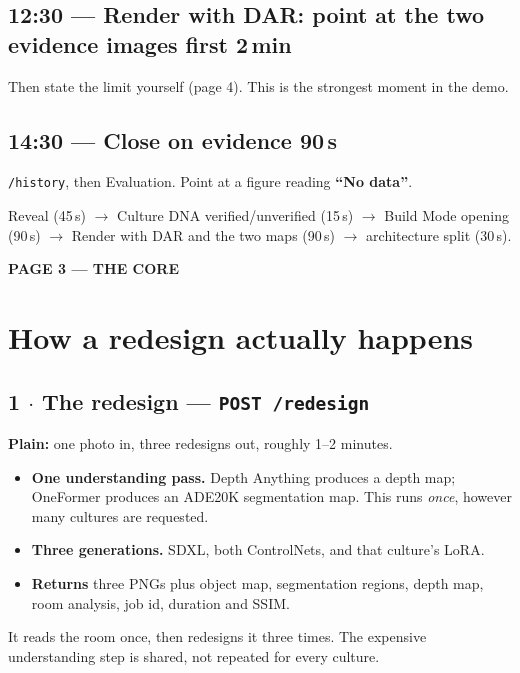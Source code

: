 \documentclass[10.5pt,a4paper]{article}
\newcommand{\pagelabel}[2]{%
  {\sffamily\bfseries\scriptsize\color{brass}\MakeUppercase{Page #1 --- #2}}\par\vspace{0.2em}}
\begin{document}
\subsection*{12:30 --- Render with DAR: point at the two evidence images first \hfill \textnormal{\small 2\,min}}
Then state the limit yourself (page 4). This is the strongest moment in the demo.

\subsection*{14:30 --- Close on evidence \hfill \textnormal{\small 90\,s}}
\texttt{/history}, then Evaluation. Point at a figure reading \textbf{``No data''}.

\begin{avoid}
Reveal (45\,s) $\rightarrow$ Culture DNA verified/unverified (15\,s) $\rightarrow$ Build Mode
opening (90\,s) $\rightarrow$ Render with DAR and the two maps (90\,s) $\rightarrow$ architecture
split (30\,s).
\end{avoid}

\newpage
\pagelabel{3}{the core}
\section*{How a redesign actually happens}

\subsection*{1 $\cdot$ The redesign --- \texttt{POST /redesign}}
\textbf{Plain:} one photo in, three redesigns out, roughly 1--2 minutes.
\begin{itemize}[leftmargin=1.1em,itemsep=1pt]
  \item \textbf{One understanding pass.} Depth Anything produces a depth map; OneFormer produces an
        ADE20K segmentation map. This runs \emph{once}, however many cultures are requested.
  \item \textbf{Three generations.} SDXL, both ControlNets, and that culture's LoRA.
  \item \textbf{Returns} three PNGs plus object map, segmentation regions, depth map, room analysis,
        job id, duration and SSIM.
\end{itemize}
\begin{sayit}
It reads the room once, then redesigns it three times. The expensive understanding step is shared,
not repeated for every culture.
\end{sayit}
\end{document}
